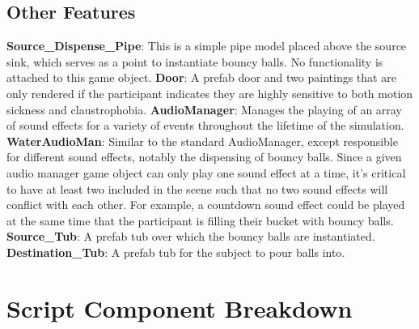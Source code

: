 \documentclass{article}
\begin{document}
\subsection*{Other Features} 
\textbf{Source\_Dispense\_Pipe}: This is a simple pipe model placed above the source sink, which serves as a point to instantiate bouncy balls. No functionality is attached to this game object.\newline \newline
\textbf{Door}: A prefab door and two paintings that are only rendered if the participant indicates they are highly sensitive to both motion sickness and claustrophobia.\newline \newline
\textbf{AudioManager}: Manages the playing of an array of sound effects for a variety of events throughout the lifetime of the simulation. \newline \newline
\textbf{WaterAudioMan}: Similar to the standard AudioManager, except responsible for different sound effects, notably the dispensing of bouncy balls. Since a given audio manager game object can only play one sound effect at a time, it's critical to have at least two included in the scene such that no two sound effects will conflict with each other. For example, a countdown sound effect could be played at the same time that the participant is filling their bucket with bouncy balls. \newline \newline
\textbf{Source\_Tub}: A prefab tub over which the bouncy balls are instantiated. \newline \newline
\textbf{Destination\_Tub}: A prefab tub for the subject to pour balls into. 


\pagebreak\section*{Script Component Breakdown}
\end{document}
